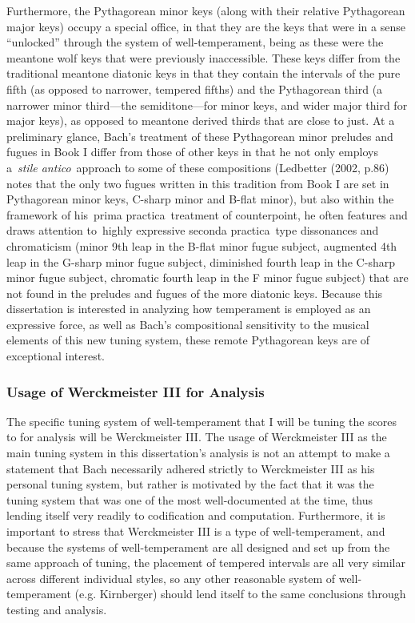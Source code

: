 Furthermore, the Pythagorean minor keys (along with their relative
Pythagorean major keys) occupy a special office, in that they are the
keys that were in a sense ``unlocked'' through the system of
well-temperament, being as these were the meantone wolf keys that were
previously inaccessible. These keys differ from the traditional meantone
diatonic keys in that they contain the intervals of the pure fifth (as
opposed to narrower, tempered fifths) and the Pythagorean third (a
narrower minor third---the semiditone---for minor keys, and wider major
third for major keys), as opposed to meantone derived thirds that are
close to just. At a preliminary glance, Bach's treatment of these
Pythagorean minor preludes and fugues in Book I differ from those of
other keys in that he not only employs a~\emph{stile antico}~approach to
some of these compositions (Ledbetter (2002, p.86) notes that the only
two fugues written in this tradition from Book I are set in Pythagorean
minor keys, C-sharp minor and B-flat minor), but also within the
framework of his~prima practica~treatment of counterpoint, he often
features and draws attention to~highly expressive seconda practica~type
dissonances and chromaticism (minor 9th leap in the B-flat minor fugue
subject, augmented 4th leap in the G-sharp minor fugue subject,
diminished fourth leap in the C-sharp minor fugue subject, chromatic
fourth leap in the F minor fugue subject) that are not found in the
preludes and fugues of the more diatonic keys. Because this dissertation
is interested in analyzing how temperament is employed as an expressive
force, as well as Bach's compositional sensitivity to the musical
elements of this new tuning system, these remote Pythagorean keys are of
exceptional interest.

\subsubsection{Usage of Werckmeister III for
Analysis}\label{usage-of-werckmeister-iii-for-analysis}

The specific tuning system of well-temperament that I will be tuning the
scores to for analysis will be Werckmeister III. The usage of
Werckmeister III as the main tuning system in this dissertation's
analysis is not an attempt to make a statement that Bach necessarily
adhered strictly to Werckmeister III as his personal tuning system, but
rather is motivated by the fact that it was the tuning system that was
one of the most well-documented at the time, thus lending itself very
readily to codification and computation. Furthermore, it is important to
stress that Werckmeister III is a type of well-temperament, and because
the systems of well-temperament are all designed and set up from the
same approach of tuning, the placement of tempered intervals are all
very similar across different individual styles, so any other reasonable
system of well-temperament (e.g. Kirnberger) should lend itself to the
same conclusions through testing and analysis.

